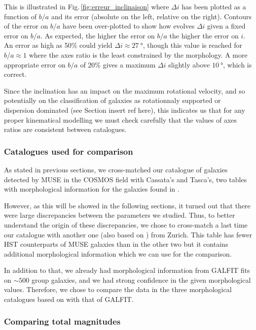 This is illustrated in Fig.\,\ref{fig:erreur_inclinaison} where $\Delta i$ has been plotted as a function of $b/a$ and its error (absolute on the left, relative on the right). Contours of the error on $b/a$ have been over-plotted to show how evolves $\Delta i$ given a fixed error on $b/a$. As expected, the higher the error on $b/a$ the higher the error on $i$. An error as high as 50\% could yield $\Delta i \approx \SI{27}{\degree}$, though this value is reached for $b/a \approx 1$ where the axes ratio is the least constrained by the morphology. A more appropriate error on $b/a$ of 20\% gives a maximum $\Delta i$ slightly above $\SI{10}{\degree}$, which is correct. 

Since the inclination has an impact on the maximum rotational velocity, and so potentially on the classification of galaxies as rotationnaly supported or dispersion dominated (see Section insert ref here), this indicates us that for any proper kinematical modelling we must check carefully that the values of axes ratios are consistent between catalogues.

\subsubsection{Catalogues used for comparison}

As stated in previous sections, we cross-matched our catalogue of galaxies detected by MUSE in the COSMOS field with Cassata's and Tasca's, two tables with morphological information for the galaxies found in . 

However, as this will be showed in the following sections, it turned out that there were large discrepancies between the parameters we studied. Thus, to better understand the origin of these discrepancies, we chose to cross-match a last time our catalogue with another one (also based on ) from Zurich. This table has fewer HST counterparts of MUSE galaxies than in the other two but it contains additional morphological information which we can use for the comparison. 

In addition to that, we already had morphological information from GALFIT fits on $\sim 500$ group galaxies, and we had strong confidence in the given morphological values. Therefore, we chose to compare the data in the three morphological catalogues based on  with that of GALFIT.

\subsubsection{Comparing total magnitudes}

